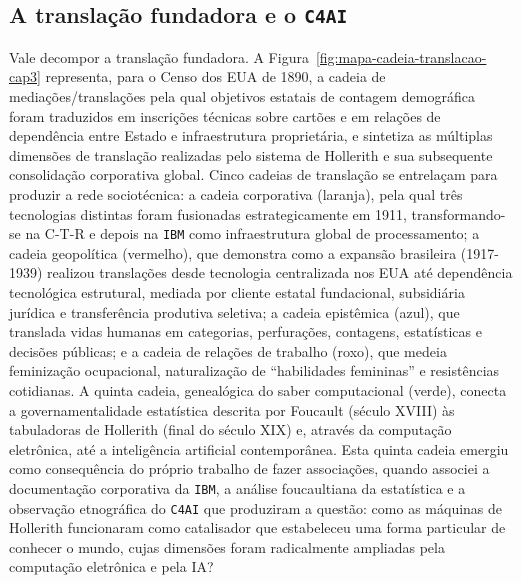 \subsection{A translação fundadora e o \texttt{C4AI}}
\label{subsec:translacao_fundadora_cap3}

Vale decompor a translação fundadora. A Figura~\ref{fig:mapa-cadeia-translacao-cap3} representa, para o Censo dos EUA de 1890, a cadeia de mediações/translações pela qual objetivos estatais de contagem demográfica foram traduzidos em inscrições técnicas sobre cartões e em relações de dependência entre Estado e infraestrutura proprietária, e sintetiza as múltiplas dimensões de translação realizadas pelo sistema de Hollerith e sua subsequente consolidação corporativa global. Cinco cadeias de translação se entrelaçam para produzir a rede sociotécnica: a cadeia corporativa (laranja), pela qual três tecnologias distintas foram fusionadas estrategicamente em 1911, transformando-se na C-T-R e depois na \texttt{IBM} como infraestrutura global de processamento; a cadeia geopolítica (vermelho), que demonstra como a expansão brasileira (1917-1939) realizou translações desde tecnologia centralizada nos EUA até dependência tecnológica estrutural, mediada por cliente estatal fundacional, subsidiária jurídica e transferência produtiva seletiva; a cadeia epistêmica (azul), que translada vidas humanas em categorias, perfurações, contagens, estatísticas e decisões públicas; e a cadeia de relações de trabalho (roxo), que medeia feminização ocupacional, naturalização de \enquote{habilidades femininas} e resistências cotidianas. A quinta cadeia, genealógica do saber computacional (verde), conecta a governamentalidade estatística descrita por Foucault (século XVIII) às tabuladoras de Hollerith (final do século XIX) e, através da computação eletrônica, até a inteligência artificial contemporânea. Esta quinta cadeia emergiu como consequência do próprio trabalho de fazer associações, quando associei a documentação corporativa da \texttt{IBM}, a análise foucaultiana da estatística e a observação etnográfica do \texttt{C4AI} que produziram a questão: como as máquinas de Hollerith funcionaram como catalisador que estabeleceu uma forma particular de conhecer o mundo, cujas dimensões foram radicalmente ampliadas pela computação eletrônica e pela IA?

